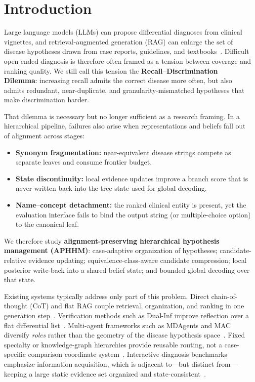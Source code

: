 \section{Introduction}
\label{sec:intro}

Large language models (LLMs) can propose differential diagnoses from clinical vignettes, and retrieval-augmented generation (RAG) can enlarge the set of disease hypotheses drawn from case reports, guidelines, and textbooks~\cite{lewis2020rag,wei2022cot,xiong2024medrag}.
Difficult open-ended diagnosis is therefore often framed as a tension between coverage and ranking quality.
We still call this tension the \textbf{Recall--Discrimination Dilemma}: increasing recall admits the correct disease more often, but also admits redundant, near-duplicate, and granularity-mismatched hypotheses that make discrimination harder.

That dilemma is necessary but no longer sufficient as a research framing.
In a hierarchical pipeline, failures also arise when representations and beliefs fall out of alignment across stages:
\begin{itemize}
  \item \textbf{Synonym fragmentation:} near-equivalent disease strings compete as separate leaves and consume frontier budget.
  \item \textbf{State discontinuity:} local evidence updates improve a branch score that is never written back into the tree state used for global decoding.
  \item \textbf{Name--concept detachment:} the ranked clinical entity is present, yet the evaluation interface fails to bind the output string (or multiple-choice option) to the canonical leaf.
\end{itemize}
We therefore study \textbf{alignment-preserving hierarchical hypothesis management (APHHM)}: case-adaptive organization of hypotheses; candidate-relative evidence updating; equivalence-class-aware candidate compression; local posterior write-back into a shared belief state; and bounded global decoding over that state.

Existing systems typically address only part of this problem.
Direct chain-of-thought (CoT) and flat RAG couple retrieval, organization, and ranking in one generation step~\cite{wei2022cot,medrag,imedrag}.
Verification methods such as Dual-Inf improve reflection over a flat differential list~\cite{dualinf2025}.
Multi-agent frameworks such as MDAgents and MAC diversify \emph{roles} rather than the geometry of the disease hypothesis space~\cite{mdagents,chen2025mac,mac2026}.
Fixed specialty or knowledge-graph hierarchies provide reusable routing, not a case-specific comparison coordinate system~\cite{kg4diagnosis}.
Interactive diagnosis benchmarks emphasize information acquisition, which is adjacent to---but distinct from---keeping a large static evidence set organized and state-consistent~\cite{sdbench2025,meddxagent2025}.

